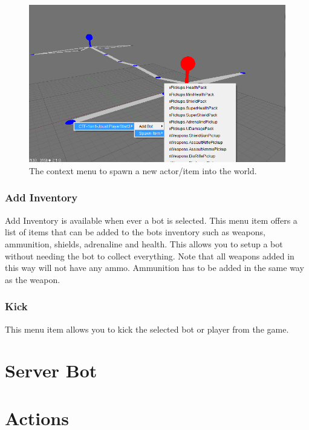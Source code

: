 \documentclass[11pt,a4paper]{article}
\begin{document}
\begin{figure}[h!]
\centering
\includegraphics[width=1.0\textwidth]{images/spawn_actor.png}
\caption{The context menu to spawn a new actor/item into the world.}\label{fig:spawn_actor}
\end{figure}


\subsubsection*{Add Inventory}
Add Inventory is available when ever a bot is selected. This menu item offers a list of items that can be added to the bots inventory such as weapons, ammunition, shields, adrenaline and health. This allows you to setup a bot without needing the bot to collect everything. Note that all weapons added in this way will not have any ammo. Ammunition has to be added in the same way as the weapon.

\subsubsection*{Kick}
This menu item allows you to kick the selected bot or player from the game.


%
%
%
\section{Server Bot}\label{sec:unrealgoalbot}
%

\section{Actions}
\end{document}
